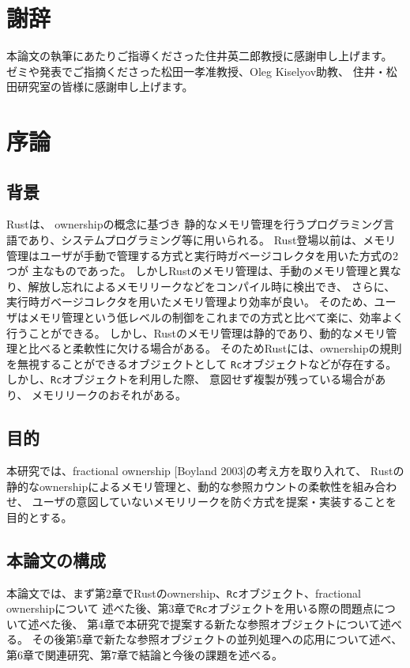 \documentclass{sumiilab-paper}
\theoremstyle{mystyle}
\numberwithin{definition}{chapter} %
\begin{document}
\chapter{謝辞}
本論文の執筆にあたりご指導くださった住井英二郎教授に感謝申し上げます。
ゼミや発表でご指摘くださった松田一孝准教授、Oleg Kiselyov助教、
住井・松田研究室の皆様に感謝申し上げます。

\tableofcontents%

\mainmatter%

\chapter{序論}
\section{背景}
Rust\cite{DBLP:conf/sigada/MatsakisK14}は、
ownership\cite{DBLP:conf/oopsla/ClarkePN98}の概念に基づき
静的なメモリ管理を行うプログラミング言語であり、システムプログラミング等に用いられる。
Rust登場以前は、メモリ管理はユーザが手動で管理する方式と実行時ガベージコレクタを用いた方式の2つが
主なものであった。
しかしRustのメモリ管理は、手動のメモリ管理と異なり、解放し忘れによるメモリリークなどをコンパイル時に検出でき、
さらに、実行時ガベージコレクタを用いたメモリ管理より効率が良い。
そのため、ユーザはメモリ管理という低レベルの制御をこれまでの方式と比べて楽に、効率よく行うことができる。
しかし、Rustのメモリ管理は静的であり、動的なメモリ管理と比べると柔軟性に欠ける場合がある。
そのためRustには、ownershipの規則を無視することができるオブジェクトとして
\texttt{Rc}オブジェクトなどが存在する。
しかし、\texttt{Rc}オブジェクトを利用した際、
意図せず複製が残っている場合があり、
メモリリークのおそれがある。

\section{目的}
本研究では、fractional ownership [Boyland 2003]の考え方を取り入れて、
Rustの静的なownershipによるメモリ管理と、動的な参照カウントの柔軟性を組み合わせ、
ユーザの意図していないメモリリークを防ぐ方式を提案・実装することを目的とする。

\section{本論文の構成}
本論文では、まず第2章でRustのownership、\texttt{Rc}オブジェクト、fractional ownershipについて
述べた後、第3章で\texttt{Rc}オブジェクトを用いる際の問題点について述べた後、
第4章で本研究で提案する新たな参照オブジェクトについて述べる。
その後第5章で新たな参照オブジェクトの並列処理への応用について述べ、
第6章で関連研究、第7章で結論と今後の課題を述べる。
\end{document}
